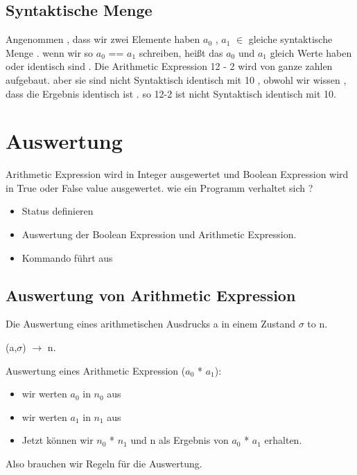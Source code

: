 \documentclass[a4paper,12pt,twoside,headsepline]{scrartcl}
\begin{document}
\subsection{Syntaktische Menge }
Angenommen , dass wir zwei Elemente haben $a_0$ , $a_1$  $\in$ gleiche syntaktische Menge . wenn wir so  $a_0$ == $a_1$ schreiben, heißt das $a_0$ und $a_1$ gleich Werte haben oder identisch sind . 
Die  Arithmetic Expression 12 - 2  wird von ganze zahlen aufgebaut. aber sie sind nicht Syntaktisch identisch mit 10 , obwohl wir wissen , dass die Ergebnis identisch ist . so 12-2 ist nicht  Syntaktisch identisch mit 10.

\section{Auswertung}
Arithmetic Expression wird in Integer ausgewertet und Boolean Expression wird in True oder False value ausgewertet.
wie ein Programm verhaltet sich ?
\begin{itemize}
	\item<1-> Status definieren
	\item<2-> Auswertung der Boolean Expression und Arithmetic Expression.
	\item <3-> Kommando führt aus
\end{itemize}

\subsection{Auswertung von Arithmetic Expression}
Die Auswertung eines arithmetischen Ausdrucks a in einem Zustand  $\sigma$ to n.

\begin{center}  (a,$\sigma$) $\to$ n.    
\end{center}
                      
Auswertung eines Arithmetic Expression  ($a_0$ * $a_1$):
\begin{itemize}
\item wir werten  $a_0$  in $n_0$ aus
\item wir werten $a_1$ in $n_1$ aus
\item Jetzt können wir $n_0$ * $n_1$ und n als Ergebnis von $a_0$ * $a_1$ erhalten.
\end{itemize}
Also brauchen wir Regeln für die Auswertung.
\end{document}
